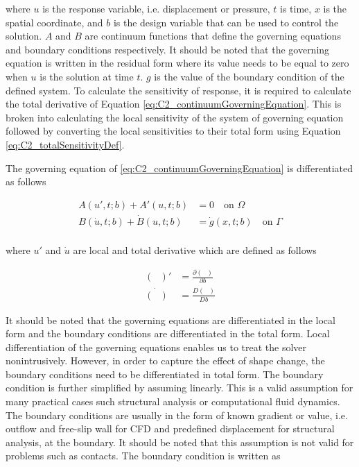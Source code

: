 where $u$ is the response variable, i.e. displacement or pressure, $t$ is time, $x$ is the spatial coordinate, and $b$ is the design variable that can be used to control the solution. $A$ and $B$ are continuum functions that define the governing equations and boundary conditions respectively. It should be noted that the governing equation is written in the residual form where its value needs to be equal to zero when $u$ is the solution at time $t$. $g$ is the value of the boundary condition of the defined system. To calculate the sensitivity of response, it is required to calculate the total derivative of Equation \eqref{eq:C2_continuumGoverningEquation}. This is broken into calculating the local sensitivity of the system of governing equation followed by converting the local sensitivities to their total form using Equation \eqref{eq:C2_totalSensitivityDef}.

The governing equation of \eqref{eq:C2_continuumGoverningEquation} is differentiated as follows

\begin{subequations}\label{eq:C2_continuumSensitivityFormulation}
\begin{align}
	A(u', t; b) + A'(u, t; b) &= 0 \quad \text{on } \Omega \\
	B(\dot{u}, t; b) + \dot{B}(u, t; b) &= \dot{g}(x, t; b) \quad \text{on } \Gamma \\
\end{align}	
\end{subequations}

where $u'$ and $\dot{u}$ are local and total derivative which are defined as follows

\begin{subequations}
\begin{align*}
	(\text{ })' &= \frac{\partial (\text{ })}{\partial b} \\
	\dot{(\text{ })} &= \frac{D (\text{ })}{D b}
\end{align*}
\end{subequations}

It should be noted that the governing equations are differentiated in the local form and the boundary conditions are differentiated in the total form. Local differentiation of the governing equations enables us to treat the solver nonintrusively. However, in order to capture the effect of shape change, the boundary conditions need to be differentiated in total form. The boundary condition is further simplified by assuming linearly. This is a valid assumption for many practical cases such structural analysis or computational fluid dynamics. The boundary conditions are usually in the form of known gradient or value, i.e. outflow and free-slip wall for CFD and predefined displacement for structural analysis, at the boundary. It should be noted that this assumption is not valid for problems such as contacts. The boundary condition is written as


